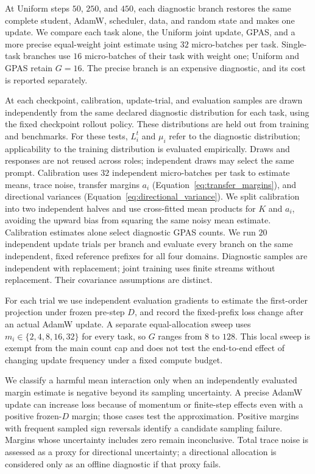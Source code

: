 At Uniform steps $50$, $250$, and $450$, each diagnostic branch restores the
same complete student, AdamW, scheduler, data, and random state and makes one
update. We compare each task alone, the Uniform joint update, GPAS, and a
more precise equal-weight joint estimate using $32$ micro-batches per task.
Single-task branches use $16$ micro-batches of their task with weight one;
Uniform and GPAS retain $G=16$. The precise branch is an expensive diagnostic,
and its cost is reported separately.

At each checkpoint, calibration, update-trial, and evaluation samples are
drawn independently from the same declared diagnostic distribution for each
task, using the fixed checkpoint rollout policy. These distributions are
held out from training and benchmarks. For these tests, $L_i^t$ and $\mu_i$
refer to the diagnostic distribution; applicability to the training
distribution is evaluated empirically. Draws and responses are not reused
across roles; independent draws may select the same prompt. Calibration uses
$32$ independent micro-batches per task to estimate means, trace noise,
transfer margins $a_i$ (Equation~\ref{eq:transfer_margins}), and directional
variances (Equation~\ref{eq:directional_variance}). We split calibration into
two independent halves and use cross-fitted mean products for $K$ and $a_i$,
avoiding the upward bias from squaring the same noisy mean estimate.
Calibration estimates alone select diagnostic GPAS counts. We run $20$
independent update trials per branch and evaluate every branch on the same independent, fixed reference
prefixes for all four domains. Diagnostic samples are independent with replacement; joint training uses
finite streams without replacement. Their covariance assumptions are distinct.

For each trial we use independent evaluation gradients to estimate the
first-order projection under frozen pre-step $D$, and record the fixed-prefix
loss change after an actual AdamW update. A separate equal-allocation sweep uses
$m_i\in\{2,4,8,16,32\}$ for every task, so $G$ ranges from $8$ to $128$.
This local sweep is exempt from the main count cap and does not test the
end-to-end effect of changing update frequency under a fixed compute budget.

We classify a harmful mean interaction only when an independently evaluated
margin estimate is negative beyond its sampling uncertainty. A precise AdamW
update can increase loss because of momentum or finite-step effects even with
a positive frozen-$D$ margin; those cases test the approximation. Positive
margins with frequent sampled sign reversals identify a candidate sampling
failure. Margins whose uncertainty includes zero remain inconclusive.
Total trace noise is assessed as a proxy for directional uncertainty; a directional allocation
is considered only as an offline diagnostic if that proxy fails.

